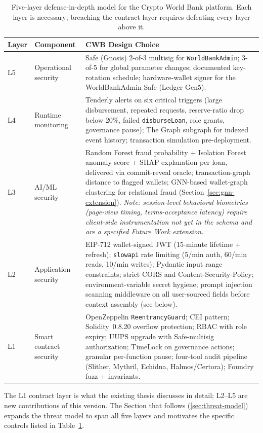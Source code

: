 \documentclass[12pt,a4paper]{report}
\begin{document}
\begin{table}[H]
\centering
\caption{Five-layer defense-in-depth model for the Crypto World Bank platform. Each layer is necessary; breaching the contract layer requires defeating every layer above it.}
\label{tab:defense-layers}
\begin{tabular}{p{1.4cm}p{4.0cm}p{8.5cm}}
\hline
\textbf{Layer} & \textbf{Component} & \textbf{CWB Design Choice} \\
\hline
L5 & Operational security & Safe (Gnosis) 2-of-3 multisig for \texttt{WorldBankAdmin}; 3-of-5 for global parameter changes; documented key-rotation schedule; hardware-wallet signer for the WorldBankAdmin Safe (Ledger Gen5). \\
\hline
L4 & Runtime monitoring & Tenderly alerts on six critical triggers (large disbursement, repeated requests, reserve-ratio drop below 20\%, failed \texttt{disburseLoan}, role grants, governance pause); The Graph subgraph for indexed event history; transaction simulation pre-deployment. \\
\hline
L3 & AI/ML security & Random Forest fraud probability + Isolation Forest anomaly score + SHAP explanation per loan, delivered via commit-reveal oracle; transaction-graph distance to flagged wallets; GNN-based wallet-graph clustering for relational fraud (Section~\ref{sec:gnn-extension}). \textit{Note: session-level behavioral biometrics (page-view timing, terms-acceptance latency) require client-side instrumentation not yet in the schema and are a specified Future Work extension.} \\
\hline
L2 & Application security & EIP-712 wallet-signed JWT (15-minute lifetime + refresh); \texttt{slowapi} rate limiting (5/min auth, 60/min reads, 10/min writes); Pydantic input range constraints; strict CORS and Content-Security-Policy; environment-variable secret hygiene; prompt injection scanning middleware on all user-sourced fields before context assembly (see below). \\
\hline
L1 & Smart contract security & OpenZeppelin \texttt{ReentrancyGuard}; CEI pattern; Solidity~0.8.20 overflow protection; RBAC with role expiry; UUPS upgrade with Safe-multisig authorization; TimeLock on governance actions; granular per-function pause; four-tool audit pipeline (Slither, Mythril, Echidna, Halmos/Certora); Foundry fuzz + invariants. \\
\hline
\end{tabular}
\end{table}

The L1 contract layer is what the existing thesis discusses in detail; L2--L5 are new contributions of this version. The Section that follows (\ref{sec:threat-model}) expands the threat model to span all five layers and motivates the specific controls listed in Table~\ref{tab:defense-layers}.
\end{document}
